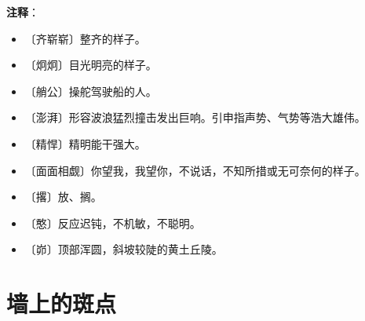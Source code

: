 \documentclass[12pt,UTF-8,openany]{ctexbook}
\begin{document}
\newpage

\textbf{注释}：

\vspace{-1em}

\begin{itemize}
    \setlength\itemsep{-0.2em}
    \item 〔齐崭崭〕整齐的样子。
    \item 〔炯炯〕目光明亮的样子。
    \item 〔艄公〕操舵驾驶船的人。
    \item 〔澎湃〕形容波浪猛烈撞击发出巨响。引申指声势、气势等浩大雄伟。
    \item 〔精悍〕精明能干强大。
    \item 〔面面相觑〕你望我，我望你，不说话，不知所措或无可奈何的样子。
    \item 〔撂〕放、搁。
    \item 〔憨〕反应迟钝，不机敏，不聪明。
    \item 〔峁〕顶部浑圆，斜坡较陡的黄土丘陵。
\end{itemize}

\chapter{墙上的斑点}
\end{document}
